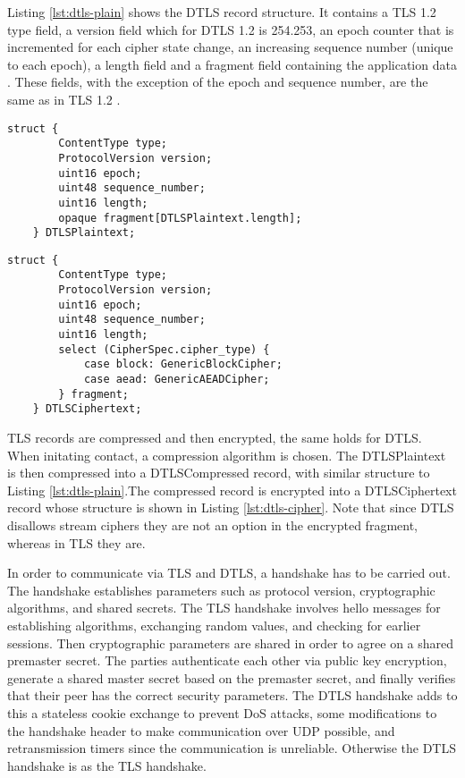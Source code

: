 \documentclass[0-thesis.tex]{subfiles}
\begin{document}
Listing \ref{lst:dtls-plain} shows the DTLS record structure. It contains a TLS 1.2 type
field, a version field which for DTLS 1.2 is 254.253, an epoch counter that is incremented
for each cipher state change, an increasing sequence number (unique to each epoch), a
length field and a fragment field containing the application data \parencite{rfc5246}.
These fields, with the exception of the epoch and sequence number, are the same 
as in TLS 1.2 \parencite{rfc6347}.

\lstset{language=C}
\begin{lstlisting}[caption={The DTLS plaintext record structure.}, label={lst:dtls-plain}]
    struct {
        ContentType type;
        ProtocolVersion version;
        uint16 epoch;
        uint48 sequence_number;
        uint16 length;
        opaque fragment[DTLSPlaintext.length];
    } DTLSPlaintext;
\end{lstlisting}

\begin{lstlisting}[caption={The DTLS ciphertext record structure.}, label={lst:dtls-cipher}]
    struct {
        ContentType type;
        ProtocolVersion version;
        uint16 epoch;
        uint48 sequence_number;
        uint16 length;
        select (CipherSpec.cipher_type) {
            case block: GenericBlockCipher;
            case aead: GenericAEADCipher;
        } fragment;
    } DTLSCiphertext;
\end{lstlisting}

TLS records are compressed and then encrypted, the same holds for DTLS. When initating
contact, a compression algorithm is chosen. The DTLSPlaintext is then compressed into a
DTLSCompressed record, with similar structure to Listing \ref{lst:dtls-plain}.The
compressed record is encrypted into a DTLSCiphertext record whose structure is shown in
Listing \ref{lst:dtls-cipher}. Note that since DTLS disallows stream ciphers they are not
an option in the encrypted fragment, whereas in TLS they are.

In order to communicate via TLS and DTLS, a handshake has to be carried out. The handshake
establishes parameters such as protocol version, cryptographic algorithms, and shared
secrets. The TLS handshake involves hello messages for establishing algorithms, exchanging
random values, and checking for earlier sessions. Then cryptographic parameters are shared
in order to agree on a shared premaster secret. The parties authenticate each other via
public key encryption, generate a shared master secret based on the premaster secret, and
finally verifies that their peer has the correct security parameters. The DTLS handshake
adds to this a stateless cookie exchange to prevent DoS attacks, some modifications to the
handshake header to make communication over UDP possible, and retransmission timers since
the communication is unreliable. Otherwise the DTLS handshake is as the TLS handshake.
\end{document}
